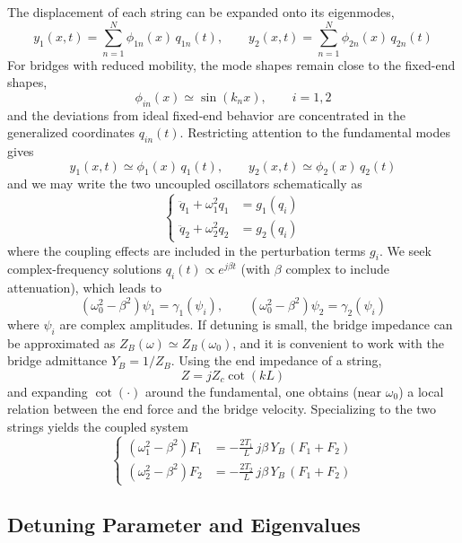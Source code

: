 The displacement of each string can be expanded onto its eigenmodes,
\[
y_1(x,t) = \sum_{n = 1}^{N}\phi_{1n}(x)\,q_{1n}(t),
\qquad
y_2(x,t) = \sum_{n = 1}^{N}\phi_{2n}(x)\,q_{2n}(t)
\]
For bridges with reduced mobility, the mode shapes remain close to the fixed-end shapes,
\[
\phi_{in}(x) \simeq \sin(k_n x),\qquad i = 1,2
\]
and the deviations from ideal fixed-end behavior are concentrated in the generalized coordinates \( q_{in}(t) \). Restricting attention to the fundamental modes gives
\[
y_1(x,t) \simeq \phi_1(x)\,q_1(t),\qquad
y_2(x,t) \simeq \phi_2(x)\,q_2(t)
\]
and we may write the two uncoupled oscillators schematically as
\[
\left\{
\begin{aligned}
\ddot{q}_1+\omega_1^2 q_1 & = g_1(q_i)\\
\ddot{q}_2+\omega_2^2 q_2 & = g_2(q_i)
\end{aligned}
\right.
\]
where the coupling effects are included in the perturbation terms \( g_i \). We seek complex-frequency solutions \( q_i(t) \propto e^{j\beta t} \) (with \( \beta \) complex to include attenuation), which leads to
\[
(\omega_0^2-\beta^2)\psi_1 = \gamma_1(\psi_i),
\qquad
(\omega_0^2-\beta^2)\psi_2 = \gamma_2(\psi_i)
\]
where \( \psi_i \) are complex amplitudes.
If detuning is small, the bridge impedance can be approximated as \( Z_B(\omega) \simeq Z_B(\omega_0) \), and it is convenient to work with the bridge admittance \( Y_B = 1/Z_B \). Using the end impedance of a string,
\[
Z = jZ_c\cot(kL)
\]
and expanding \( \cot(\cdot) \) around the fundamental, one obtains (near \( \omega_0 \)) a local relation between the end force and the bridge velocity. Specializing to the two strings yields the coupled system
\[
\left\{
\begin{aligned}
(\omega_1^2-\beta^2)F_1 & = -\frac{2T_1}{L}\,j\beta\,Y_B\,(F_1+F_2)\\
(\omega_2^2-\beta^2)F_2 & = -\frac{2T_2}{L}\,j\beta\,Y_B\,(F_1+F_2)
\end{aligned}
\right.
\]

\subsection{Detuning Parameter and Eigenvalues}

